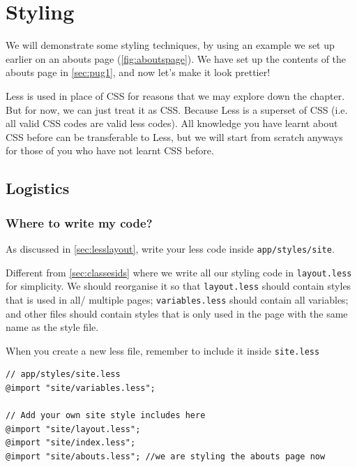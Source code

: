 \chapter{Styling}
\label{sec:styling}

We will demonstrate some styling techniques, by using an example we set up earlier on an abouts page (\cref{fig:aboutspage}). We have set up the contents of the abouts page in \cref{sec:pug1}, and now let's make it look prettier!
\vspace{6mm}

Less is used in place of CSS for reasons that we may explore down the chapter. But for now, we can just treat it as CSS. Because Less is a superset of CSS (i.e. all valid CSS codes are valid less codes). All knowledge you have learnt about CSS before can be transferable to Less, but we will start from scratch anyways for those of you who have not learnt CSS before.


\section{Logistics}

\subsection*{Where to write my code?}

As discussed in \cref{sec:lesslayout}, write your less code inside \texttt{app/styles/site}. 
\vspace{6mm}

Different from \cref{sec:classesids} where we write all our styling code in \texttt{layout.less} for simplicity. We should reorganise it so that \texttt{layout.less} should contain styles that is used in all/ multiple pages; \texttt{variables.less} should contain all variables; and other files should contain styles that is only used in the page with the same name as the style file.

When you create a new less file, remember to include it inside \texttt{site.less}

\begin{lstlisting}
// app/styles/site.less
@import "site/variables.less";

// Add your own site style includes here
@import "site/layout.less";
@import "site/index.less";
@import "site/abouts.less"; //we are styling the abouts page now
\end{lstlisting}


